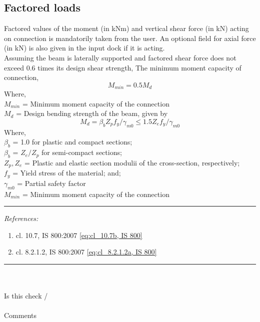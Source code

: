 \documentclass[11.5pt,a4paper,oneside]{report}
\newcommand{\okornot}{ \vspace{15mm} \hrule
	\noindent \\ \\
	Is this check \qquad
	\CheckBox[checked=False, name= ok]{\textbf{Ok}} \qquad / 
	\CheckBox[checked=False, name= notok]{\textbf{Not Ok}}\\ \\
	Comments \\ \\
	\noindent
	\TextField[name=multilinetextbox, multiline=true, width=1.0\linewidth,height=2in]{}}
\newcommand{\checkrefernces} {
	\vspace{15mm} \hrule \vspace{2mm}
	\textit{References:}}
\begin{document}
\begin{Form}
\chapter{Factored loads}
%
Factored values of the moment (in kNm) and vertical shear force  (in kN) acting on connection is mandatorily taken from the user. An optional field for axial force (in kN) is also given in the input dock if it is acting.\\
Assuming the beam is laterally supported and factored shear force does not exceed 0.6 times its design shear strength, 
The minimum moment capacity of connection,
	\begin{equation}\label{eq:cl_10.7b, IS 800}
		M_{min} = 0.5 M_d 
	\end{equation}
	Where, \\
		\indent $M_{min}$ = Minimum moment capacity of the connection \\
		\indent $M_d$ = Design bending strength of the beam, given by
	\begin{equation} \label{eq:cl_8.2.1.2a, IS 800}
		M_d = \beta_b Z_p f_y / \gamma_{m0} \le 1.5 Z_e f_y / \gamma_{m0} 
	\end{equation}
	Where, \\
		\indent $\beta_b$ = 1.0 for plastic and compact sections;\\
		\indent $\beta_b$ = $Z_e/Z_p$ for semi-compact sections;\\
		\indent $Z_p, Z_e$ = Plastic and elastic section modulii of the cross-section, respectively; \\
		\indent $f_y$ = Yield stress of the material; and;\\
		\indent $\gamma_{m0}$ = Partial safety factor \\
		\indent $M_{min}$ = Minimum moment capacity of the connection

\checkrefernces
\begin{enumerate}
	\item cl. 10.7, IS 800:2007 \eqref{eq:cl_10.7b, IS 800} 
	\item cl. 8.2.1.2, IS 800:2007 \eqref{eq:cl_8.2.1.2a, IS 800} 
\end{enumerate}
\okornot

\end{Form}
\end{document}
